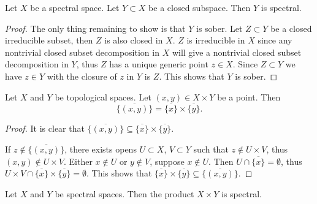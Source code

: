 \begin{lemma}
  \label{thm:closed-subspace-spectral}
  Let $X$ be a spectral space. Let $Y \subset X$ be a closed subspace. Then $Y$ is spectral.
\end{lemma}

\begin{proof}
  The only thing remaining to show is that $Y$ is sober. Let $Z \subset Y$ be a closed irreducible subset, then $Z$ is also closed in $X$. $Z$ is irreducible in $X$ since any nontrivial closed subset decomposition in $X$ will give a nontrivial closed subset decomposition in $Y$, thus $Z$ has a unique generic point $z \in X$. Since $Z \subset Y$ we have $z \in Y$ with the closure of $z$ in $Y$ is $Z$. This shows that $Y$ is sober.
\end{proof}

\begin{lemma}
  \label{thm:closure-product}
  Let $X$ and $Y$ be topological spaces. Let $(x, y) \in X \times Y$ be a point. Then 
  \[\overline{\{(x, y)\}} = \overline{\{x\}} \times \overline{\{y\}}.\]
\end{lemma}

\begin{proof}
  It is clear that \(\overline{\{(x, y)\}} \subseteq \overline{\{x\}} \times \overline{\{y\}}\).

  If \(z \notin \overline{\{(x, y)\}}\), there exists opens \(U \subset X\), \(V \subset Y\) such that \(z \notin U \times V\), thus \((x, y) \notin U \times V\). Either \(x \notin U\) or \(y \notin V\), suppose \(x \notin U\). Then \(U \cap \overline{\{x\}} = \emptyset\), thus \(U \times V \cap \overline{\{x\}} \times \overline{\{y\}}  = \emptyset\). This shows that \(\overline{\{x\}} \times \overline{\{y\}} \subseteq \overline{\{(x, y)\}}\).
\end{proof}

\begin{lemma}
  \label{thm:spectral-product}
  Let $X$ and $Y$ be spectral spaces. Then the product $X \times Y$ is spectral.
\end{lemma}

